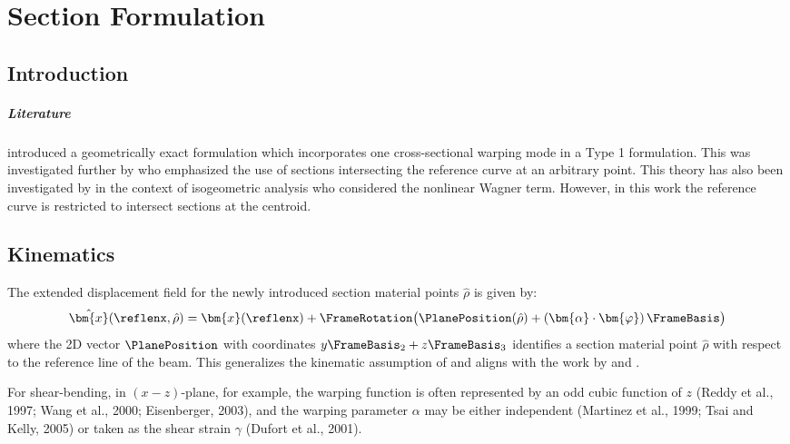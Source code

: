 \chapter{Section Formulation }\label{ch:section-theory}

\section{Introduction}


\paragraph{Literature}
\cite{simo1991geometricallyexact} introduced a geometrically exact formulation which incorporates one cross-sectional warping mode in a Type 1 formulation. 
This was investigated further by \cite{gruttmann2000theory} who emphasized the use of sections intersecting the reference curve at an arbitrary point. 
This theory has also been investigated by \cite{rong2020geometrically} in the context of isogeometric analysis who considered the nonlinear Wagner term. However, in this work the reference curve is restricted to intersect sections at the centroid. 

\section{Kinematics}

The extended displacement field for the newly introduced section material points $\hat{\rho}$  is given by:
\begin{equation}
\hat{\bm{x}}(\reflenx, \hat{\rho}) 
= \bm{x}(\reflenx) + \FrameRotation \bigl(\PlanePosition (\hat{\rho}) + (\bm{\alpha}\cdot\bm{\varphi})\, \FrameBasis\bigr)
\label{eq:section-displacement}
\end{equation}
%
where the 2D vector $\PlanePosition$ with coordinates $y\FrameBasis_{2} + z\FrameBasis_3$ identifies a section material point $\hat{\rho}$ with respect to the reference line of the beam. 
This generalizes the kinematic assumption of \cite{simo1991geometricallyexact} and aligns with the work by \cite{klinkel2003anisotropic} and \cite{elfatmi2007nonuniform}.

For shear-bending, in $(x-z)$-plane, for example, the warping function is often represented by an odd cubic function of $z$ (Reddy et al., 1997; Wang et al., 2000; Eisenberger, 2003), and the warping parameter $\alpha$ may be either independent (Martinez et al., 1999; Tsai and Kelly, 2005) or taken as the shear strain $\gamma$ (Dufort et al., 2001).

